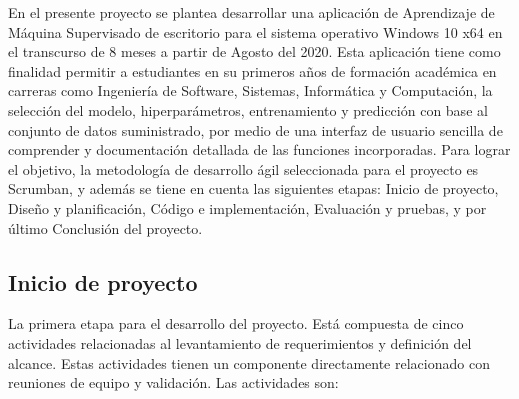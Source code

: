 En el presente proyecto se plantea desarrollar una aplicación de Aprendizaje de Máquina Supervisado de escritorio para el sistema operativo Windows 10 x64 en el transcurso de 8 meses a partir de Agosto del 2020. Esta aplicación tiene como finalidad permitir a estudiantes en su primeros años de formación académica en carreras como Ingeniería de Software, Sistemas, Informática y Computación, la selección del modelo, hiperparámetros, entrenamiento y predicción con base al conjunto de datos suministrado, por medio de una interfaz de usuario sencilla de comprender y documentación detallada de las funciones incorporadas. Para lograr el objetivo, la metodología de desarrollo ágil seleccionada para el proyecto es Scrumban, y además se tiene en cuenta las siguientes etapas: Inicio de proyecto, Diseño y planificación, Código e implementación, Evaluación y pruebas, y por último Conclusión del proyecto.

\subsection{Inicio de proyecto}
La primera etapa para el desarrollo del proyecto. Está compuesta de cinco actividades relacionadas al levantamiento de requerimientos y definición del alcance. Estas actividades tienen un componente directamente relacionado con reuniones de equipo y validación. Las actividades son:

